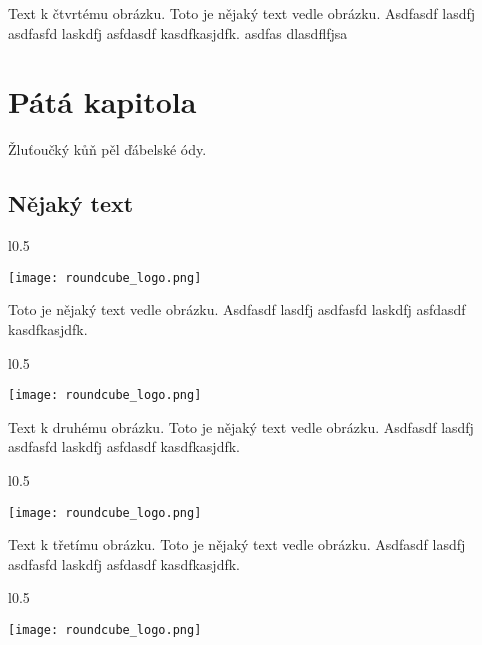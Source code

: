 \documentclass[12pt,a4paper,twoside]{book}
\begin{document}
Text k čtvrtému obrázku. Toto je nějaký text vedle obrázku. Asdfasdf lasdfj asdfasfd laskdfj asfdasdf kasdfkasjdfk.
\newline
asdfas dlasdflfjsa 
\chapter{Pátá kapitola}
Žluťoučký kůň pěl ďábelské ódy.
\section{Nějaký text}

\begin{wrapfigure}{l}{0.5\textwidth}
  \vspace{-30pt}
  \begin{center}
    \texttt{[image: roundcube\_logo.png]}
  \end{center}
  \vspace{-10pt}
\end{wrapfigure}

Toto je nějaký text vedle obrázku. Asdfasdf lasdfj asdfasfd laskdfj asfdasdf kasdfkasjdfk.
\newline

\begin{wrapfigure}{l}{0.5\textwidth}
  \vspace{-20pt}
  \begin{center}
    \texttt{[image: roundcube\_logo.png]}
  \end{center}
  \vspace{-20pt}
\end{wrapfigure}

Text k druhému obrázku. Toto je nějaký text vedle obrázku. Asdfasdf lasdfj asdfasfd laskdfj asfdasdf kasdfkasjdfk.
\newline

\begin{wrapfigure}{l}{0.5\textwidth}
  \vspace{-20pt}
  \begin{center}
    \texttt{[image: roundcube\_logo.png]}
  \end{center}
  \vspace{-20pt}
\end{wrapfigure}
Text k třetímu obrázku. Toto je nějaký text vedle obrázku. Asdfasdf lasdfj asdfasfd laskdfj asfdasdf kasdfkasjdfk.
\newline

\begin{wrapfigure}{l}{0.5\textwidth}
  \vspace{-20pt}
  \begin{center}
    \texttt{[image: roundcube\_logo.png]}
  \end{center}
  \vspace{-20pt}
\end{wrapfigure}
\end{document}
